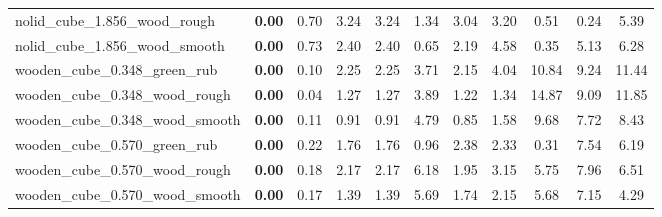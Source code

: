 \begin{table}[H]
{\begin{tabular}{l cccccccccc}
        nolid\_cube\_1.856\_wood\_rough & \textbf{0.00} & 0.70 & 3.24 & 3.24 & 1.34 & 3.04 & 3.20 & 0.51 & 0.24 & 5.39 \\
        nolid\_cube\_1.856\_wood\_smooth & \textbf{0.00} & 0.73 & 2.40 & 2.40 & 0.65 & 2.19 & 4.58 & 0.35 & 5.13 & 6.28 \\
        wooden\_cube\_0.348\_green\_rub & \textbf{0.00} & 0.10 & 2.25 & 2.25 & 3.71 & 2.15 & 4.04 & 10.84 & 9.24 & 11.44 \\
        wooden\_cube\_0.348\_wood\_rough & \textbf{0.00} & 0.04 & 1.27 & 1.27 & 3.89 & 1.22 & 1.34 & 14.87 & 9.09 & 11.85 \\
        wooden\_cube\_0.348\_wood\_smooth & \textbf{0.00} & 0.11 & 0.91 & 0.91 & 4.79 & 0.85 & 1.58 & 9.68 & 7.72 & 8.43 \\
        wooden\_cube\_0.570\_green\_rub & \textbf{0.00} & 0.22 & 1.76 & 1.76 & 0.96 & 2.38 & 2.33 & 0.31 & 7.54 & 6.19 \\
        wooden\_cube\_0.570\_wood\_rough & \textbf{0.00} & 0.18 & 2.17 & 2.17 & 6.18 & 1.95 & 3.15 & 5.75 & 7.96 & 6.51 \\
        wooden\_cube\_0.570\_wood\_smooth & \textbf{0.00} & 0.17 & 1.39 & 1.39 & 5.69 & 1.74 & 2.15 & 5.68 & 7.15 & 4.29 \\
        \bottomrule
    \end{tabular}
    }
\end{table}
